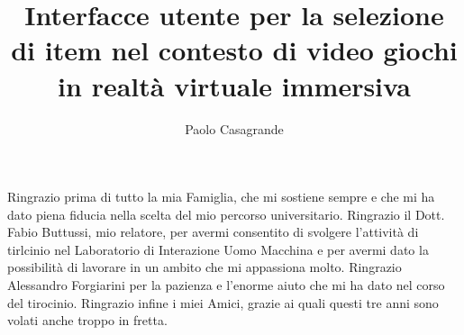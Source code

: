 \documentclass[target=bach,aauheader=]{thud}
\title{Interfacce utente per la selezione \\ di item nel contesto di video giochi \\ in realtà virtuale immersiva}
\author{Paolo Casagrande}
\begin{document}
\maketitle


\acknowledgements
Ringrazio prima di tutto la mia Famiglia, che mi sostiene sempre e che mi ha dato piena fiducia nella scelta del mio percorso universitario.
Ringrazio il Dott. Fabio Buttussi, mio relatore, per avermi consentito di svolgere l'attività di tirlcinio nel Laboratorio di Interazione Uomo Macchina e per avermi dato la possibilità di lavorare in un ambito che mi appassiona molto.
Ringrazio Alessandro Forgiarini per la pazienza e l'enorme aiuto che mi ha dato nel corso del tirocinio.
Ringrazio infine i miei Amici, grazie ai quali questi tre anni sono volati anche troppo in fretta.   


\tableofcontents


\listoffigures

\mainmatter

\end{document}
